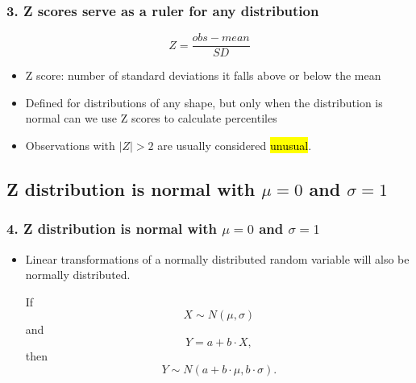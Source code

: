 \documentclass[slidestop,compress,mathserif,12pt,t,professionalfonts,xcolor=table]{beamer}
\begin{document}

\begin{frame}
\frametitle{3. Z scores serve as a ruler for any distribution}

\[ Z = \frac{obs - mean}{SD} \]

\begin{itemize}

\item Z score: number of standard deviations it falls above or below the mean

\pause

\item Defined for distributions of any shape, but only when the distribution is normal can we use Z scores to calculate percentiles

\pause

\item Observations with $|Z| > 2$ are usually considered \hl{unusual}.

\end{itemize}


\end{frame}


\subsection{Z distribution is normal with $\mu = 0$ and $\sigma = 1$}
\label{mi4}


\begin{frame}
\frametitle{4. Z distribution is normal with $\mu = 0$ and $\sigma = 1$}

\begin{itemize}

\item Linear transformations of a normally distributed random variable will also be normally distributed.

If
\[
X \sim N(\mu, \sigma)
\]
and
\[
Y = a + b \cdot X,
\]
then
\[
Y \sim N(a + b \cdot \mu, b \cdot \sigma).
\]

\end{itemize}

\end{frame}
\end{document}
